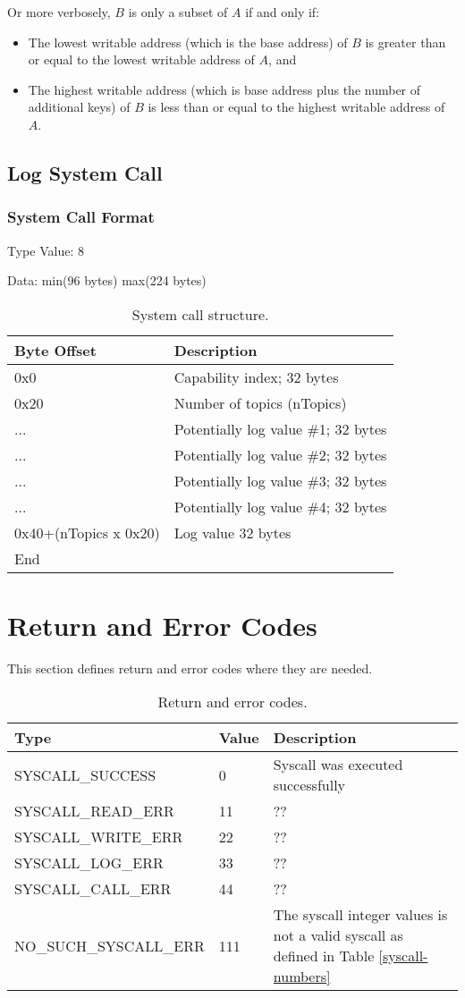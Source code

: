 \documentclass[english,a4paper]{article}
\let\oldparagraph\subsubsection
\renewcommand{\subsubsection}[1]{\oldparagraph{#1}\mbox{}}
\begin{document}
Or more verbosely, $B$ is only a subset of $A$ if and only if:
\begin{itemize}
  \item The lowest writable address (which is the base address) of $B$ is
  greater than or equal to the lowest writable address of $A$, and
  \item The highest writable address (which is base address plus the number of
  additional keys) of $B$ is less than or equal to the highest writable address
  of $A$.
\end{itemize}

\subsection{Log System Call}

\subsubsection{System Call Format}
Type Value: 8

Data: min(96 bytes) max(224 bytes)

\begin{table}[H]
  \caption{System call structure.}
  \centering{}%
  \begin{tabular}{l|p{}}
    \hline
    Byte Offset & Description\tabularnewline
    \hline
    \hline
    0x0 & Capability index; 32 bytes \tabularnewline
    0x20 & Number of topics (nTopics) \tabularnewline
    ... & Potentially log value \#1; 32 bytes \tabularnewline
    ... & Potentially log value \#2; 32 bytes \tabularnewline
    ... & Potentially log value \#3; 32 bytes \tabularnewline
    ... & Potentially log value \#4; 32 bytes \tabularnewline
    0x40+(nTopics x 0x20) & Log value 32 bytes \tabularnewline
    \hline
    End &  \tabularnewline
    \hline
  \end{tabular}
\end{table}

\section{Return and Error Codes}
This section defines return and error codes where they are needed.

\begin{table}[H]
  \caption{Return and error codes.}
  \centering{}%
  \begin{tabular}{l|l|p{}}
    \hline
    Type & Value & Description\tabularnewline
    \hline
    \hline
    SYSCALL\_SUCCESS      & 0 & Syscall was executed successfully \tabularnewline
    SYSCALL\_READ\_ERR    & 11 & ?? \tabularnewline
    SYSCALL\_WRITE\_ERR   & 22 & ?? \tabularnewline
    SYSCALL\_LOG\_ERR     & 33 & ?? \tabularnewline
    SYSCALL\_CALL\_ERR    & 44 & ?? \tabularnewline
    NO\_SUCH\_SYSCALL\_ERR & 111 & The syscall integer values is not a valid
      syscall as defined in Table \ref{syscall-numbers} \tabularnewline
    \hline
  \end{tabular}
\end{table}
\end{document}
